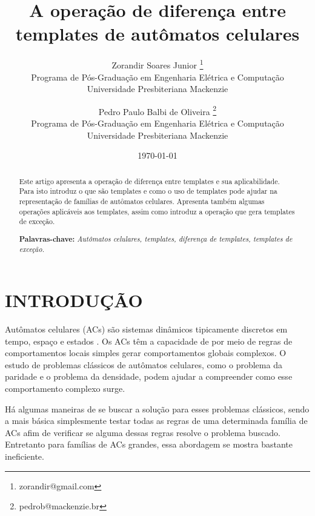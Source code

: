 \documentclass[12pt, a4paper]{article}
\title{A operação de diferença entre templates de autômatos celulares}
\author{Zorandir Soares Junior \footnote{zorandir@gmail.com} \\
 	Programa de Pós-Graduação em Engenharia Elétrica e Computação \\
	Universidade Presbiteriana Mackenzie
	\and
	Pedro Paulo Balbi de Oliveira \footnote{pedrob@mackenzie.br}  \\
 	Programa de Pós-Graduação em Engenharia Elétrica e Computação \\
	Universidade Presbiteriana Mackenzie
	}
\date{\today}
\begin{document}

\pagestyle{plain}
\renewcommand{\baselinestretch}{1.25} 
\normalsize

\maketitle

\begin{abstract}
 Este artigo apresenta a operação de diferença entre templates e sua aplicabilidade. Para isto introduz o que são templates e como o uso de templates pode ajudar na representação de famílias de autômatos celulares. Apresenta também algumas operações aplicáveis aos templates, assim como introduz a operação que gera templates de exceção.

\begin{flushleft}
{\bf Palavras-chave:} {\it Autômatos celulares, templates, diferença de templates, templates de exceção.}
\end{flushleft}
\end{abstract}

\section{INTRODUÇÃO}
\label{sec:introducao}
Autômatos celulares (ACs) são sistemas dinâmicos tipicamente discretos em tempo, espaço e estados \cite{wolfram2002}. Os ACs têm a capacidade de por meio de regras de comportamentos locais simples gerar comportamentos globais complexos. O estudo de problemas clássicos de autômatos celulares, como o problema da paridade \cite{Betel2013} e o problema da densidade\cite{Land1995}, podem ajudar a compreender como esse comportamento complexo surge.

Há algumas maneiras de se buscar a solução para esses problemas clássicos, sendo a mais básica simplesmente testar todas as regras de uma determinada família de ACs afim de verificar se alguma dessas regras resolve o problema buscado. 
Entretanto para famílias de ACs grandes, essa abordagem se mostra bastante ineficiente.
\end{document}
